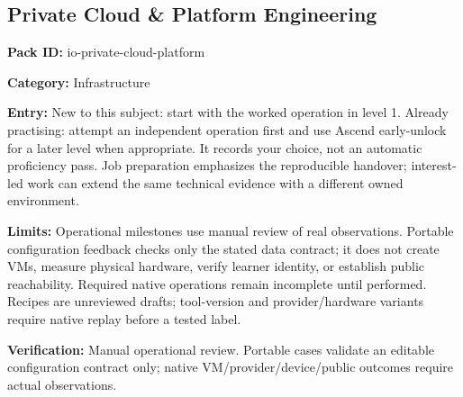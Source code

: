 \subsection{Private Cloud \& Platform Engineering}
\noindent\textbf{Pack ID:} io-private-cloud-platform\par
\noindent\textbf{Category:} Infrastructure\par
\noindent\textbf{Entry:} New to this subject: start with the worked operation in level 1. Already practising: attempt an independent operation first and use Ascend early-unlock for a later level when appropriate. It records your choice, not an automatic proficiency pass. Job preparation emphasizes the reproducible handover; interest-led work can extend the same technical evidence with a different owned environment.\par
\noindent\textbf{Limits:} Operational milestones use manual review of real observations. Portable configuration feedback checks only the stated data contract; it does not create VMs, measure physical hardware, verify learner identity, or establish public reachability. Required native operations remain incomplete until performed. Recipes are unreviewed drafts; tool-version and provider/hardware variants require native replay before a tested label.\par
\noindent\textbf{Verification:} Manual operational review. Portable cases validate an editable configuration contract only; native VM/provider/device/public outcomes require actual observations.\par
